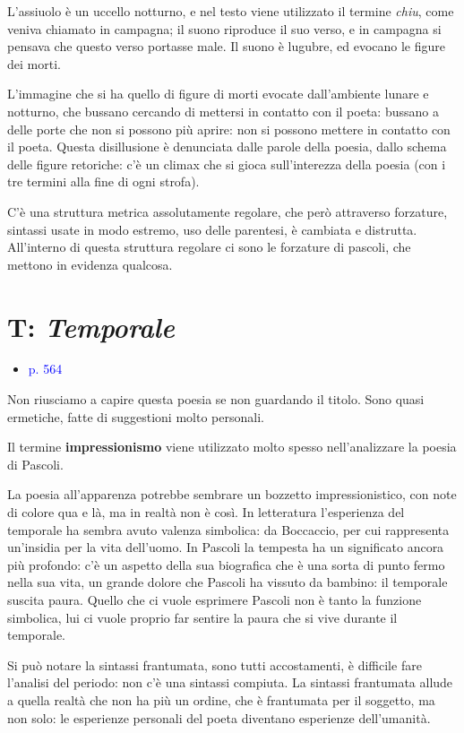 \documentclass[a4paper, twoside, titlepage]{book}
\newcommand{\elenco}[1]{%
\begin{itemize}
#1
\end{itemize}}
\renewcommand{\emph}[1]{\textcolor{blue}{#1}}
\begin{document}
L'assiuolo è un uccello notturno, e nel testo viene utilizzato il termine \textit{chiu}, come veniva chiamato in campagna; il suono riproduce il suo verso, e in campagna si pensava che questo verso portasse male.
Il suono è lugubre, ed evocano le figure dei morti.

L'immagine che si ha quello di figure di morti evocate dall'ambiente lunare e notturno, che bussano cercando di mettersi in contatto con il poeta: bussano a delle porte che non si possono più aprire: non si possono mettere in contatto con il poeta.
Questa disillusione è denunciata dalle parole della poesia, dallo schema delle figure retoriche: c'è un climax che si gioca sull'interezza della poesia (con i tre termini alla fine di ogni strofa).

C'è una struttura metrica assolutamente regolare, che però attraverso forzature, sintassi usate in modo estremo, uso delle parentesi, è cambiata e distrutta. All'interno di questa struttura regolare ci sono le forzature di pascoli, che mettono in evidenza qualcosa.

\section{T: \textit{Temporale}}
\elenco{\item \emph{p. 564}}

Non riusciamo a capire questa poesia se non guardando il titolo. Sono quasi ermetiche, fatte di suggestioni molto personali.

Il termine \textbf{impressionismo} viene utilizzato molto spesso nell'analizzare la poesia di Pascoli.

La poesia all'apparenza potrebbe sembrare un bozzetto impressionistico, con note di colore qua e là, ma in realtà non è così.
In letteratura l'esperienza del temporale ha sembra avuto valenza simbolica: da Boccaccio, per cui rappresenta un'insidia per la vita dell'uomo.
In Pascoli la tempesta ha un significato ancora più profondo: c'è un aspetto della sua biografica che è una sorta di punto fermo nella sua vita, un grande dolore che Pascoli ha vissuto da bambino: il temporale suscita paura.
Quello che ci vuole esprimere Pascoli non è tanto la funzione simbolica, lui ci vuole proprio far sentire la paura che si vive durante il temporale.

Si può notare la sintassi frantumata, sono tutti accostamenti, è difficile fare l'analisi del periodo: non c'è una sintassi compiuta. La sintassi frantumata allude a quella realtà che non ha più un ordine, che è frantumata per il soggetto, ma non solo: le esperienze personali del poeta diventano esperienze dell'umanità.
\end{document}
